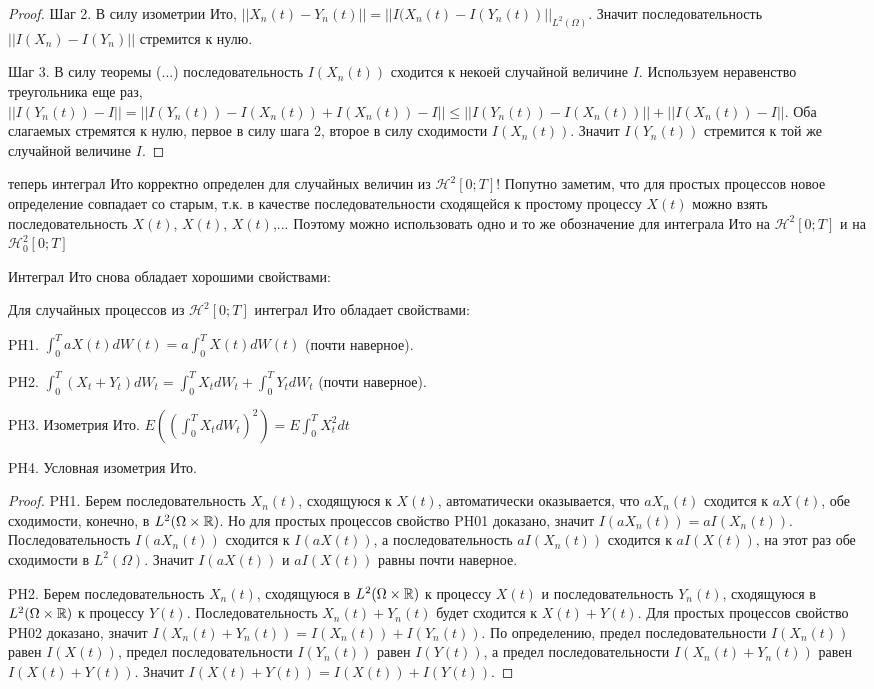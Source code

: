 {\begin{proof}
Шаг 2. В силу изометрии Ито, $||X_{n}(t)-Y_{n}(t)||=||I(X_{n}(t)-I(Y_{n}(t))||_{L^{2}(\Omega)}$. Значит последовательность $||I(X_{n})-I(Y_{n})||$ стремится к нулю.

Шаг 3. В силу теоремы (...) последовательность $I(X_{n}(t))$ сходится к некоей случайной величине $I$. Используем неравенство треугольника еще раз, $||I(Y_{n}(t))-I||=||I(Y_{n}(t))-I(X_{n}(t))+I(X_{n}(t))-I||\leq ||I(Y_{n}(t))-I(X_{n}(t))||+||I(X_{n}(t))-I||$. Оба слагаемых стремятся к нулю, первое в силу шага 2, второе в силу сходимости $I(X_{n}(t))$. Значит $I(Y_{n}(t))$ стремится к той же случайной величине $I$.
\end{proof}

теперь интеграл Ито корректно определен для случайных величин из $\mathcal{H}^{2}[0;T]$! Попутно заметим, что для простых процессов новое определение совпадает со старым, т.к. в качестве последовательности сходящейся к простому процессу $X(t)$ можно взять последовательность $X(t)$, $X(t)$, $X(t)$,... Поэтому можно использовать одно и то же обозначение для интеграла Ито на $\mathcal{H}^{2}[0;T]$ и на $\mathcal{H}_{0}^{2}[0;T]$

Интеграл Ито снова обладает хорошими свойствами:

\begin{myth} Для случайных процессов из $\mathcal{H}^{2}[0;T]$ интеграл Ито обладает свойствами:

PH1. $\int_{0}^{T}aX(t)dW(t)=a\int_{0}^{T}X(t)dW(t)$ (почти наверное).

PH2. $\int_{0}^{T}(X_{t}+Y_{t})dW_{t}=\int_{0}^{T}X_{t}dW_{t}+\int_{0}^{T}Y_{t}dW_{t}$ (почти наверное).

PH3. Изометрия Ито. $E\left((\int_{0}^{T}X_{t}dW_{t})^{2}\right)=E\int_{0}^{T}X_{t}^{2}dt$

PH4. Условная изометрия Ито. 
\end{myth}
\begin{proof}

PH1. Берем последовательность $X_{n}(t)$, сходящуюся к $X(t)$, автоматически оказывается, что $aX_{n}(t)$ сходится к $aX(t)$, обе сходимости, конечно, в $L^{2}(\Omega\times \mathbb R)$. Но для простых процессов свойство PH01 доказано, значит $I(aX_{n}(t))=aI(X_{n}(t))$. Последовательность $I(aX_{n}(t))$ сходится к $I(aX(t))$, а последовательность $aI(X_{n}(t))$ сходится к $aI(X(t))$, на этот раз обе сходимости в $L^{2}(\Omega)$. Значит $I(aX(t))$ и $aI(X(t))$ равны почти наверное.

PH2. Берем последовательность $X_{n}(t)$, сходящуюся в $L^{2}(\Omega\times\mathbb R)$ к процессу $X(t)$ и последовательность $Y_{n}(t)$, сходящуюся в $L^{2}(\Omega\times\mathbb R)$ к процессу $Y(t)$. Последовательность $X_{n}(t)+Y_{n}(t)$ будет сходится к $X(t)+Y(t)$. Для простых процессов свойство PH02 доказано, значит $I(X_{n}(t)+Y_{n}(t))=I(X_{n}(t))+I(Y_{n}(t))$. По определению, предел последовательности $I(X_{n}(t))$ равен $I(X(t))$, предел последовательности $I(Y_{n}(t))$ равен $I(Y(t))$, а предел последовательности $I(X_{n}(t)+Y_{n}(t))$ равен $I(X(t)+Y(t))$. Значит $I(X(t)+Y(t))=I(X(t))+I(Y(t))$.


\end{proof}}
